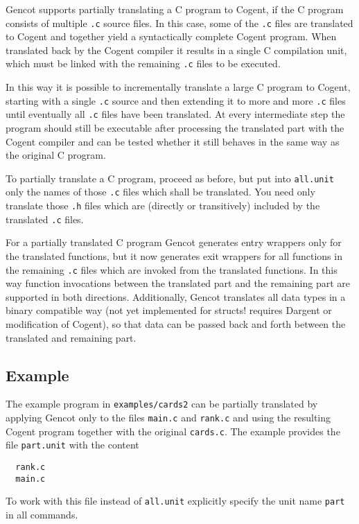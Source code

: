 \documentclass[a4paper]{report}
\newcommand{\code}[1]{\textnormal{\texttt{#1}}}
\begin{document}
Gencot supports partially translating a C program to Cogent, if the C program consists of multiple \code{.c} source
files. In this case, some of the \code{.c} files are translated to Cogent and together yield a syntactically complete 
Cogent program. When translated back by the Cogent compiler it results in a single C compilation unit, which must be
linked with the remaining \code{.c} files to be executed.

In this way it is possible to incrementally translate a large C program to Cogent, starting with a single \code{.c} 
source and then extending it to more and more \code{.c} files until eventually all \code{.c} files have been translated.
At every intermediate step the program should still be executable after processing the translated part with the Cogent
compiler and can be tested whether it still behaves in the same way as the original C program.

To partially translate a C program, proceed as before, but put into \code{all.unit} only the names of those \code{.c}
files which shall be translated. You need only translate those \code{.h} files which are (directly or transitively)
included by the translated \code{.c} files. 

For a partially translated C program Gencot generates entry wrappers only for the translated functions, but it now
generates exit wrappers for all functions in the remaining \code{.c} files which are invoked from the translated functions.
In this way function invocations between the translated part and the remaining part are supported in both directions.
Additionally, Gencot translates all data types in a binary compatible way (not yet implemented for structs! requires Dargent 
or modification of Cogent), so that data can be passed back and forth between the translated and remaining part.

\subsection{Example}

The example program in \code{examples/cards2} can be partially translated by applying Gencot only to the files \code{main.c}
and \code{rank.c} and using the resulting Cogent program together with the original \code{cards.c}. The example provides
the file \code{part.unit} with the content
\begin{verbatim}
  rank.c
  main.c
\end{verbatim}
To work with this file instead of \code{all.unit} explicitly specify the unit name \code{part} in all commands.
\end{document}
